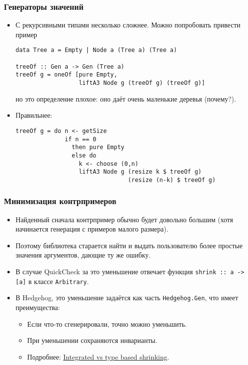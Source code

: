 \documentclass[11pt]{beamer}
\begin{document}
\begin{frame}[fragile]
  \frametitle{Генераторы значений}
  \begin{itemize}
    \item С рекурсивными типами несколько сложнее. Можно попробовать привести пример
          \begin{lstlisting}[basicstyle=\ttfamily\scriptsize]
data Tree a = Empty | Node a (Tree a) (Tree a)

treeOf :: Gen a -> Gen (Tree a)
treeOf g = oneOf [pure Empty, 
                  liftA3 Node g (treeOf g) (treeOf g)]
\end{lstlisting}
          но это определение плохое: оно даёт очень маленькие деревья (почему?).
    \item Правильнее:
          \begin{lstlisting}[basicstyle=\ttfamily\scriptsize]
treeOf g = do n <- getSize
              if n == 0
                then pure Empty
                else do
                  k <- choose (0,n)
                  liftA3 Node g (resize k $ treeOf g)
                                (resize (n-k) $ treeOf g)
\end{lstlisting}
  \end{itemize}
\end{frame}

\begin{frame}[fragile]
  \frametitle{Минимизация контрпримеров}
  \begin{itemize}
    \item Найденный сначала контрпример обычно будет довольно большим (хотя начинается генерация с примеров малого размера).
    \item Поэтому библиотека старается найти и выдать пользователю более простые значения аргументов, дающие ту же ошибку.
    \item В случае QuickCheck за это уменьшение отвечает функция \lstinline|shrink :: a -> [a]| в классе \lstinline|Arbitrary|.
    \item В Hedgehog, это уменьшение задаётся как часть \lstinline|Hedgehog.Gen|, что имеет преимущества:
          \begin{itemize}
            \item Если что-то сгенерировали, точно можно уменьшить.
            \item При уменьшении сохраняются инварианты.
            \item Подробнее: \href{https://hypothesis.works/articles/integrated-shrinking/}{Integrated vs type based shrinking}.
          \end{itemize}
  \end{itemize}
\end{frame}
\end{document}
